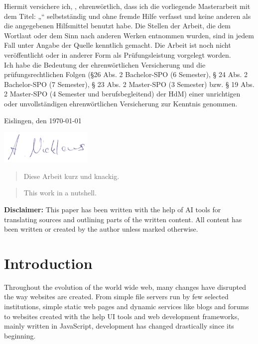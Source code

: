 \documentclass[a4paper, 10pt]{article}
\makeatletter
\let\Title\@title
\let\Author\@author
\makeatother
\begin{document}
	Hiermit versichere ich, \Author, ehrenwörtlich, dass ich die
	vorliegende Masterarbeit mit dem Titel: „\Title“ selbstständig und ohne fremde Hilfe verfasst und keine
	anderen als die angegebenen Hilfsmittel benutzt habe. Die Stellen der Arbeit, die dem
	Wortlaut oder dem Sinn nach anderen Werken entnommen wurden, sind in jedem Fall
	unter Angabe der Quelle kenntlich gemacht. Die Arbeit ist noch nicht veröffentlicht oder
	in anderer Form als Prüfungsleistung vorgelegt worden.\\
	
	Ich habe die Bedeutung der ehrenwörtlichen Versicherung und die prüfungsrechtlichen
	Folgen (§26 Abs. 2 Bachelor-SPO (6 Semester), § 24 Abs. 2 Bachelor-SPO (7 Semester), §
	23 Abs. 2 Master-SPO (3 Semester) bzw. § 19 Abs. 2 Master-SPO (4 Semester und
	berufsbegleitend) der HdM) einer unrichtigen oder unvollständigen ehrenwörtlichen
	Versicherung zur Kenntnis genommen.
	\vspace{30px}
	
	Eislingen, den \today
	\vspace{20px}
	
	\includegraphics[height=60px]{img/unterschrift.png}
	\vspace{10px}
	
	\Author

\pagebreak

\begin{abstract}
  Diese Arbeit kurz und knackig.
\end{abstract}

\begin{abstract}
  This work in a nutshell.
\end{abstract}

\vfill

\noindent\textbf{Disclaimer:} This paper has been written with the help of AI tools for translating sources and outlining parts of the written content.
All content has been written or created by the author unless marked otherwise.

\pagebreak

\tableofcontents
\pagebreak

\section{Introduction}\label{sec:introduction}
Throughout the evolution of the world wide web, many changes have disrupted the way websites are created.
From simple file servers run by few selected institutions, simple static web pages and dynamic services like blogs and forums to websites created with the help UI tools and web development frameworks, mainly written in JavaScript, development has changed drastically since its beginning.
\end{document}
